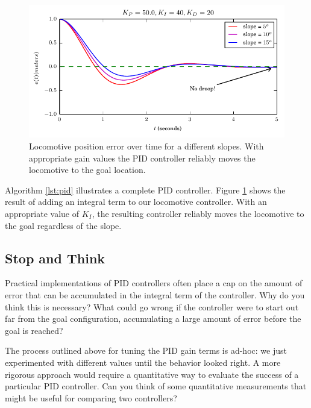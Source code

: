 \begin{figure}
\includegraphics{pid/figs/pid_result_hill.pdf}
\caption{Locomotive position error over time for a different slopes.
  With appropriate gain values the PID controller reliably moves the
  locomotive to the goal location.}
\label{fig:pid_result}
\end{figure}


Algorithm \ref{lst:pid} illustrates a complete PID controller.  Figure
\ref{fig:pid_result} shows the result of adding an integral term to
our locomotive controller.  With an appropriate value of $K_I$, the
resulting controller reliably moves the locomotive to the goal regardless
of the slope.

\subsection*{Stop and Think}
\begin{exercise}
  Practical implementations of PID controllers often place a cap on
  the amount of error that can be accumulated in the integral term of
  the controller.  Why do you think this is necessary?  What could go
  wrong if the controller were to start out far from the goal
  configuration, accumulating a large amount of error before the goal
  is reached?
\end{exercise}

\begin{exercise}
  The process outlined above for tuning the PID gain terms is ad-hoc:
  we just experimented with different values until the behavior looked
  right. A more rigorous approach would require a quantitative way to
  evaluate the success of a particular PID controller.  Can you think
  of some quantitative measurements that might be useful for comparing
  two controllers? 
\end{exercise}


